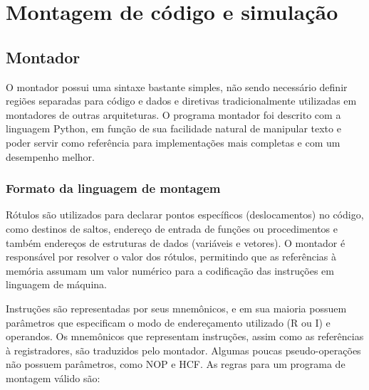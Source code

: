 \documentclass{extreport}
\begin{document}
\chapter{Montagem de código e simulação}
\label{ref:assembler}

\section{Montador}
O montador possui uma sintaxe bastante simples, não sendo necessário definir regiões separadas para código e dados e diretivas tradicionalmente utilizadas em montadores de outras arquiteturas. O programa montador foi descrito com a linguagem Python, em função de sua facilidade natural de manipular texto e poder servir como referência para implementações mais completas e com um desempenho melhor.

\subsection{Formato da linguagem de montagem}

Rótulos são utilizados para declarar pontos específicos (deslocamentos) no código, como destinos de saltos, endereço de entrada de funções ou procedimentos e também endereços de estruturas de dados (variáveis e vetores). O montador é responsável por resolver o valor dos rótulos, permitindo que as referências à memória assumam um valor numérico para a codificação das instruções em linguagem de máquina.

Instruções são representadas por seus mnemônicos, e em sua maioria possuem parâmetros que especificam o modo de endereçamento utilizado (R ou I) e operandos. Os mnemônicos que representam instruções, assim como as referências à registradores, são traduzidos pelo montador. Algumas poucas pseudo-operações não possuem parâmetros, como NOP e HCF. As regras para um programa de montagem válido são:
\end{document}
